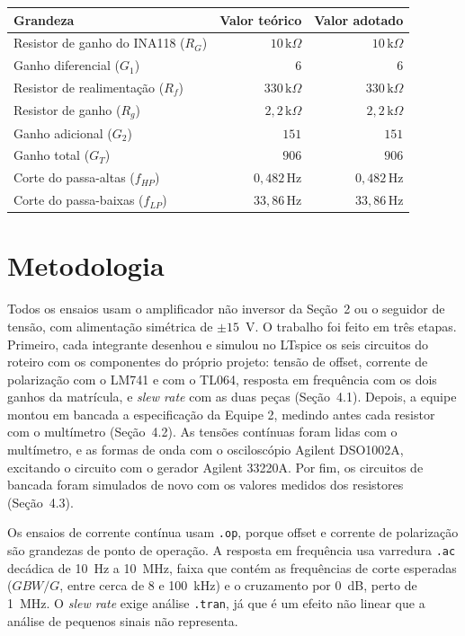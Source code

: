 \documentclass[11pt,a4paper]{article}
\begin{document}
\begin{center}
\renewcommand{\arraystretch}{1.2}
\begin{tabular}{@{}lrr@{}}
\toprule
\textbf{Grandeza} & \textbf{Valor teórico} & \textbf{Valor adotado} \\
\midrule
Resistor de ganho do INA118 ($R_G$) & $10\,\text{k}\Omega$ & $10\,\text{k}\Omega$ \\
Ganho diferencial ($G_1$) & $6$ & $6$ \\
Resistor de realimentação ($R_f$) & $330\,\text{k}\Omega$ & $330\,\text{k}\Omega$ \\
Resistor de ganho ($R_g$) & $2{,}2\,\text{k}\Omega$ & $2{,}2\,\text{k}\Omega$ \\
Ganho adicional ($G_2$) & $151$ & $151$ \\
Ganho total ($G_T$) & $906$ & $906$ \\
Corte do passa-altas ($f_{HP}$) & $0{,}482\,\text{Hz}$ & $0{,}482\,\text{Hz}$ \\
Corte do passa-baixas ($f_{LP}$) & $33{,}86\,\text{Hz}$ & $33{,}86\,\text{Hz}$ \\
\bottomrule
\end{tabular}
\end{center}



\section{Metodologia}

Todos os ensaios usam o amplificador não inversor da Seção~2 ou o seguidor de tensão, com
alimentação simétrica de $\pm15$~V. O trabalho foi feito em três etapas. Primeiro, cada integrante
desenhou e simulou no LTspice os seis circuitos do roteiro com os componentes do próprio projeto:
tensão de offset, corrente de polarização com o LM741 e com o TL064, resposta em frequência com os
dois ganhos da matrícula, e \textit{slew rate} com as duas peças (Seção~4.1). Depois, a equipe
montou em bancada a especificação da Equipe 2, medindo antes cada resistor com o multímetro
(Seção~4.2). As tensões contínuas foram lidas com o multímetro, e as formas de onda com o
osciloscópio Agilent DSO1002A, excitando o circuito com o gerador Agilent 33220A. Por fim, os
circuitos de bancada foram simulados de novo com os valores medidos dos resistores (Seção~4.3).

Os ensaios de corrente contínua usam \texttt{.op}, porque offset e corrente de polarização são
grandezas de ponto de operação. A resposta em frequência usa varredura \texttt{.ac} decádica de
10~Hz a 10~MHz, faixa que contém as frequências de corte esperadas ($GBW/G$, entre cerca de 8 e
100~kHz) e o cruzamento por $0$~dB, perto de 1~MHz. O \textit{slew rate} exige análise
\texttt{.tran}, já que é um efeito não linear que a análise de pequenos sinais não representa.
\end{document}
